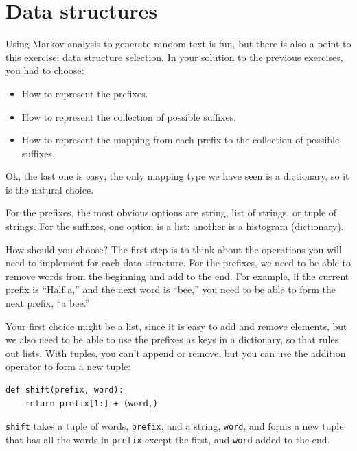 \documentclass[10pt]{book}
\begin{document}
\section{Data structures}

Using Markov analysis to generate random text is fun, but there is
also a point to this exercise: data structure selection.  In your
solution to the previous exercises, you had to choose:

\begin{itemize}

\item How to represent the prefixes.

\item How to represent the collection of possible suffixes.

\item How to represent the mapping from each prefix to
the collection of possible suffixes.

\end{itemize}

Ok, the last one is easy; the only mapping type we have
seen is a dictionary, so it is the natural choice.

For the prefixes, the most obvious options are string,
list of strings, or tuple of strings.  For the suffixes,
one option is a list; another is a histogram (dictionary).

How should you choose?  The first step is to think about
the operations you will need to implement for each data structure.
For the prefixes, we need to be able to remove words from
the beginning and add to the end.  For example, if the current
prefix is ``Half a,'' and the next word is ``bee,'' you need
to be able to form the next prefix, ``a bee.''

Your first choice might be a list, since it is easy to add
and remove elements, but we also need to be able to use the
prefixes as keys in a dictionary, so that rules out lists.
With tuples, you can't append or remove, but you can use
the addition operator to form a new tuple:

\begin{verbatim}
def shift(prefix, word):
    return prefix[1:] + (word,)
\end{verbatim}
%
{\tt shift} takes a tuple of words, {\tt prefix}, and a string, 
{\tt word}, and forms a new tuple that has all the words
in {\tt prefix} except the first, and {\tt word} added to
the end.
\end{document}

